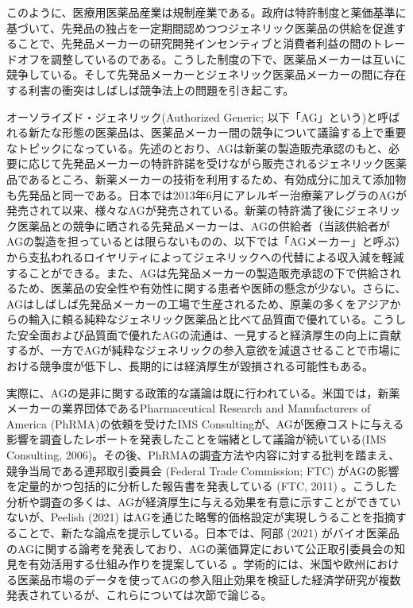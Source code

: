 \documentclass[a4j,10.5pt]{jarticle}
\begin{document}
このように、医療用医薬品産業は規制産業である。政府は特許制度と薬価基準に基づいて、先発品の独占を一定期間認めつつジェネリック医薬品の供給を促進することで、先発品メーカーの研究開発インセンティブと消費者利益の間のトレードオフを調整しているのである。こうした制度の下で、医薬品メーカーは互いに競争している。そして先発品メーカーとジェネリック医薬品メーカーの間に存在する利害の衝突はしばしば競争法上の問題を引き起こす。\par
オーソライズド・ジェネリック(Authorized Generic; 以下「AG」という)と呼ばれる新たな形態の医薬品は、医薬品メーカー間の競争について議論する上で重要なトピックになっている。先述のとおり、AGは新薬の製造販売承認のもと、必要に応じて先発品メーカーの特許許諾を受けながら販売されるジェネリック医薬品であるところ、新薬メーカーの技術を利用するため、有効成分に加えて添加物も先発品と同一である。日本では2013年6月にアレルギー治療薬アレグラのAGが発売されて以来、様々なAGが発売されている。新薬の特許満了後にジェネリック医薬品との競争に晒される先発品メーカーは、AGの供給者（当該供給者がAGの製造を担っているとは限らないものの、以下では「AGメーカー」と呼ぶ）から支払われるロイヤリティによってジェネリックへの代替による収入減を軽減することができる。また、AGは先発品メーカーの製造販売承認の下で供給されるため、医薬品の安全性や有効性に関する患者や医師の懸念が少ない。さらに、AGはしばしば先発品メーカーの工場で生産されるため、原薬の多くをアジアからの輸入に頼る純粋なジェネリック医薬品と比べて品質面で優れている。こうした安全面および品質面で優れたAGの流通は、一見すると経済厚生の向上に貢献するが、一方でAGが純粋なジェネリックの参入意欲を減退させることで市場における競争度が低下し、長期的には経済厚生が毀損される可能性もある。\par
実際に、AGの是非に関する政策的な議論は既に行われている。米国では，新薬メーカーの業界団体であるPharmaceutical Research and Manufacturers of America (PhRMA)の依頼を受けたIMS Consultingが、AGが医療コストに与える影響を調査したレポートを発表したことを端緒として議論が続いている(IMS Consulting, 2006)。その後、PhRMAの調査方法や内容に対する批判を踏まえ、競争当局である連邦取引委員会 (Federal Trade Commission; FTC) がAGの影響を定量的かつ包括的に分析した報告書を発表している (FTC, 2011) 。こうした分析や調査の多くは、AGが経済厚生に与える効果を有意に示すことができていないが、Peelish (2021) はAGを通じた略奪的価格設定が実現しうることを指摘することで、新たな論点を提示している。日本では、阿部 (2021) がバイオ医薬品のAGに関する論考を発表しており、AGの薬価算定において公正取引委員会の知見を有効活用する仕組み作りを提案している 。学術的には、米国や欧州における医薬品市場のデータを使ってAGの参入阻止効果を検証した経済学研究が複数発表されているが、これらについては次節で論じる。
\end{document}
